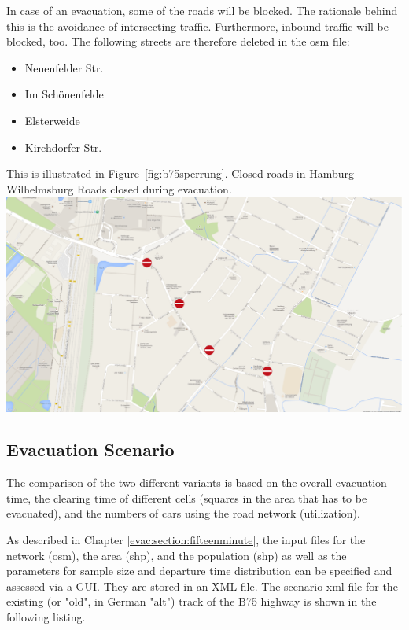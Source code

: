 In case of an evacuation, some of the roads will be blocked. The rationale behind this is the avoidance of intersecting traffic. Furthermore, inbound traffic will be blocked, too.
The following streets are therefore deleted in the osm file:
\begin{itemize}
	\item Neuenfelder Str. 
	\item Im Sch\"onenfelde
	\item Elsterweide
	\item Kirchdorfer Str.
\end{itemize}
This is illustrated in Figure~\ref{fig:b75sperrung}.
\createfigure%
{Closed roads in Hamburg-Wilhelmsburg}%
{Roads closed during evacuation.}%
{\label{fig:b75sperrung}}%
{\includegraphics[width=0.7\linewidth]{using/figures/b75sperrung}}%
{}
\subsection{Evacuation Scenario}
The comparison of the two different variants is based on the overall evacuation time, the clearing time of different cells (squares in the area that has to be evacuated), and the numbers of cars using the road network (utilization).

As described in Chapter \ref{evac:section:fifteenminute}, the input files for the network (osm), the area (shp), and the population (shp) as well as the parameters for sample size and departure time distribution can be specified and assessed via a GUI. They are stored in an XML file. The scenario-xml-file for the existing (or "old", in German "alt") track of the B75 highway is shown in the following listing. 



